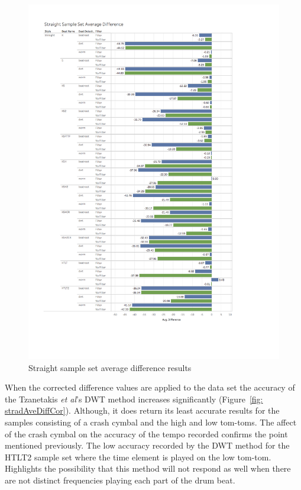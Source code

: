 \documentclass[a4paper, 11pt]{article}
\begin{document}
\begin{figure}[htbp]
\centering
\includegraphics[scale=0.38]{images/SSSAD.jpg}
\caption{Straight sample set average difference results}
\label{fig: stradAveDiff}
\end{figure}

When the corrected difference values are applied to the data set the accuracy of the Tzanetakis \textit{et al}'s \cite{tzane1} DWT method increases significantly (Figure~\ref{fig: stradAveDiffCor}). Although, it does return its least accurate results for the samples consisting of a crash cymbal and the high and low tom-toms. The affect of the crash cymbal on the accuracy of the tempo recorded confirms the point mentioned previously. The low accuracy recorded by the DWT method for the HTLT2 sample set where the time element is played on the low tom-tom. Highlights the possibility that this method will not respond as well when there are not distinct frequencies playing each part of the drum beat. \par
\end{document}
